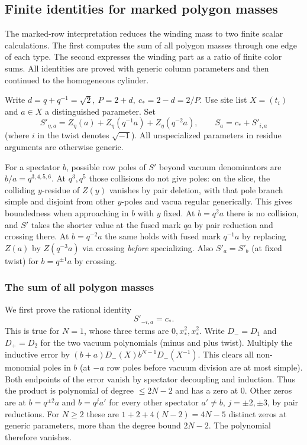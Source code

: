 \subsection{Finite identities for marked polygon masses}\label{c4:color-sum}

The marked-row interpretation reduces the winding mass to two finite
scalar calculations. The first computes the sum of all polygon masses
through one edge of each type. The second expresses the winding part as
a ratio of finite color sums. All identities are proved with generic
column parameters and then continued to the homogeneous cylinder.

Write \(d=q+q^{-1}=\sqrt2,\ P=2+d,\ c_*=2-d=2/P\). Use site list \(X=(t_i)\) and \(a\in X\) a distinguished parameter. Set
\[
 S'_{\eta,a}= Z_\eta(a)+ Z_\eta(q^{-1}a)+ Z_\eta(q^{-2}a),\qquad S_a=c_*+S'_{i,a}
\]
(where \(i\) in the twist denotes \(\sqrt{-1}\)). All unspecialized parameters in residue arguments are otherwise generic.

For a spectator \(b\), possible row poles of \(S'\) beyond vacuum denominators are \(b/a=q^{3,4,5,6}\). At \(q^3,q^5\) those collisions do not give poles: on the slice, the colliding \(y\)-residue of \(Z(y)\) vanishes by pair deletion, with that pole branch simple and disjoint from other \(y\)-poles and vacua regular generically. This gives boundedness when approaching in \(b\) with \(y\) fixed. At \(b=q^2 a\) there is no collision, and \(S'\) takes the shorter value at the fused mark \(q a\) by pair reduction and crossing there. At \(b=q^{-2}a\) the same holds with fused mark \(q^{-1}a\) by replacing \(Z(a)\) by \(Z(q^{-3}a)\) via crossing \emph{before} specializing. Also \(S'_a=S'_b\) (at fixed twist) for \(b=q^{\pm1}a\) by crossing.

\subsubsection{The sum of all polygon masses}

We first prove the rational identity
\begin{equation}\label{a:minus-scalar}
                              S'_{-i,a}=c_*.
\end{equation}
This is true for \(N=1\), whose three terms are \(0,x_*^2,x_*^2\). Write \(D_-=D_1\) and \(D_+=D_2\) for the two vacuum polynomials (minus and plus twist). Multiply the inductive error by \((b+a)D_-(X)b^{N-1}D_-(X^{-1})\). This clears all non-monomial poles in \(b\) (at \(-a\) row poles before vacuum division are at most simple). Both endpoints of the error vanish by spectator decoupling and induction. Thus the product is polynomial of degree \(\le2N-2\) and has a zero at 0. Other zeros are at \(b=q^{\pm2}a\) and \(b=q^j a'\) for every other spectator \(a'\ne b\), \(j=\pm2,\pm3\), by pair reductions. For $N\ge2$ these are
$1+2+4(N-2)=4N-5$ distinct zeros at generic parameters, more than the
degree bound $2N-2$. The polynomial therefore vanishes.

